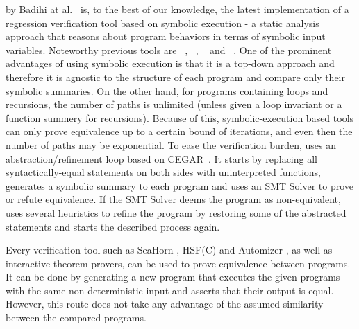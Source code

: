  by Badihi at al.~\cite{10.1145/3368089.3409757} is, to the best of our knowledge, the latest implementation of a regression verification tool based on symbolic execution - a static analysis approach that reasons about program behaviors in terms of symbolic input variables. Noteworthy previous tools are ~\cite{9285657}, ~\cite{10.1007/978-3-319-66706-5_20}, ~\cite{inproceedings} and ~\cite{10.1145/1453101.1453131}. One of the prominent advantages of using symbolic execution is that it is a top-down approach and therefore it is agnostic to the structure of each program and compare only their symbolic summaries. On the other hand, for programs containing loops and recursions, the number of paths is unlimited (unless given a loop invariant or a function summery for recursions). Because of this, symbolic-execution based tools can only prove equivalence up to a certain bound of iterations, and even then the number of paths may be exponential. To ease the verification burden,  uses an abstraction/refinement loop based on CEGAR~\cite{10.1007/10722167_15}. It starts by replacing all syntactically-equal statements on both sides with uninterpreted functions, generates a symbolic summary to each program and uses an SMT Solver to prove or refute equivalence. If the SMT Solver deems the program as non-equivalent,  uses several heuristics to refine the program by restoring some of the abstracted statements and starts the described process again.


Every verification tool such as SeaHorn \cite{DBLP:conf/cav/GurfinkelKKN15}, HSF(C) \cite{DBLP:conf/tacas/GrebenshchikovGLPR12} and Automizer \cite{DBLP:conf/cav/HeizmannHP13}, as well as interactive theorem provers, can be used to prove equivalence between programs. It can be done by generating a new program that executes the given programs with the same non-deterministic input and asserts that their output is equal. However, this route does not take any advantage of the assumed similarity between the compared programs.

